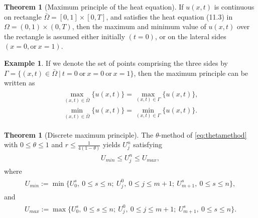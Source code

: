 \documentclass[a4paper,twoside]{ctexart}
\theoremstyle{definition}
\newtheorem{example}[definition]{Example}
\newtheorem{theorem}[definition]{Theorem}
\begin{document}
\begin{theorem}[Maximum principle of the heat equation]
	If $u(x,t)$ is continuous on rectangle $\bar{\Omega} = [0,1]\times[0,T]$, and satisfies the heat equation (11.3) in $\Omega = (0,1) \times (0,T)$, then the maximum and minimum value of $u(x,t)$ over the rectangle is assumed either initially
	$(t = 0)$, or on the lateral sides $(x = 0, \text{or}\ x = 1)$.
\end{theorem}
\begin{example}
	If we denote the set of points comprising the three sides by $\Gamma = \{(x, t) \in \bar{\Omega}\ |\ t = 0 \ \text{or}\ x = 0\ \text{or}\ x = 1\}$, then the maximum principle can be written as
	\begin{eqnarray}
	\begin{aligned}
	\max_{(x,t) \in \bar{\Omega}}\{u(x,t)\} = \max_{(x,t) \in \Gamma}\{u(x,t)\},\\
	\min_{(x,t) \in \bar{\Omega}}\{u(x,t)\} = \min_{(x,t) \in \Gamma}\{u(x,t)\}.
	\end{aligned}
	\end{eqnarray}
\end{example}
\begin{theorem}[Discrete maximum principle]
	The $\theta$-method of \eqref{eq:thetamethod} with $0 \le \theta \le 1$ and $r \le \frac{1}{4(1 − \theta)} $ yields $U_j^n$ satisfying
		\begin{eqnarray}
	\label{eq:dismaxprcp}
	\begin{aligned}
	U_{min} \le U_j^n \le U_{max},
	\end{aligned}
	\end{eqnarray}
	where 
		\begin{eqnarray}
	\label{eq:Umin}
	\begin{aligned}
	U_{min} := \min{\{U_0^s,\ 0 \le s \le n;\ U_j^0,\ 0 \le j \le m+1; \ U_{m+1}^s,\ 0 \le s \le n\}},
	\end{aligned}
	\end{eqnarray}
	and
		\begin{eqnarray}
	\label{eq:Umax}
	\begin{aligned}
	U_{max} := \max{\{U_0^s,\ 0 \le s \le n;\ U_j^0,\ 0 \le j \le m+1; \ U_{m+1}^s,\ 0 \le s \le n\}}.
	\end{aligned}
	\end{eqnarray}
\end{theorem}
\end{document}
